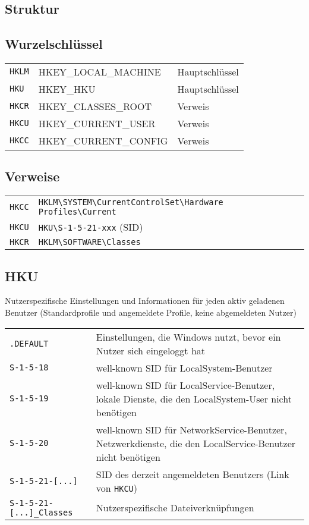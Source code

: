 \begin{multicols}{3}
\section{Struktur}
\subsection{Wurzelschlüssel}
\begin{tabular}{@{}p{\MyLen}%
				@{}p{\MyLenTwo}%
				@{}p{\linewidth-\the\MyLen-\the\MyLenTwo}@{}}
\texttt{HKLM} & HKEY\_LOCAL\_MACHINE & Hauptschlüssel \\
\texttt{HKU} & HKEY\_HKU & Hauptschlüssel \\
\texttt{HKCR} & HKEY\_CLASSES\_ROOT & Verweis\\
\texttt{HKCU} & HKEY\_CURRENT\_USER & Verweis\\
\texttt{HKCC} & HKEY\_CURRENT\_CONFIG & Verweis \\
\end{tabular}

\subsection{Verweise}
\settowidth{\MyLen}{HKCR.sp }
\begin{tabular}{@{}p{\the\MyLen}%
		@{}p{\linewidth-\the\MyLen}@{}}
\texttt{HKCC} & \texttt{HKLM\textbackslash SYSTEM\textbackslash CurrentControlSet\textbackslash Hardware Profiles\textbackslash Current} \\
\texttt{HKCU} & \texttt{HKU\textbackslash S-1-5-21-xxx} (SID)\\
\texttt{HKCR} & \texttt{HKLM\textbackslash SOFTWARE\textbackslash Classes}
\end{tabular}

\subsection{HKU}
Nutzerspezifische Einstellungen und Informationen für jeden aktiv geladenen Benutzer (Standardprofile und angemeldete Profile, keine abgemeldeten Nutzer)
\settowidth{\MyLen}{SID.classes.length.long.}
\begin{tabular}{@{}p{\the\MyLen}%
		@{}p{\linewidth-\the\MyLen}@{}}
	\texttt{.DEFAULT} & Einstellungen, die Windows nutzt, bevor ein Nutzer sich eingeloggt hat \\
	\texttt{S-1-5-18} & well-known SID für LocalSystem-Benutzer\\
	\texttt{S-1-5-19} & well-known SID für LocalService-Benutzer, lokale Dienste, die den LocalSystem-User nicht benötigen\\
	\texttt{S-1-5-20} & well-known SID für NetworkService-Benutzer, Netzwerkdienste, die den LocalService-Benutzer nicht benötigen\\
	\texttt{S-1-5-21-[...]} & SID des derzeit angemeldeten Benutzers (Link von \texttt{HKCU})\\
	\texttt{S-1-5-21-[...]\_Classes} & Nutzerspezifische Dateiverknüpfungen\\
\end{tabular}


\end{multicols}
